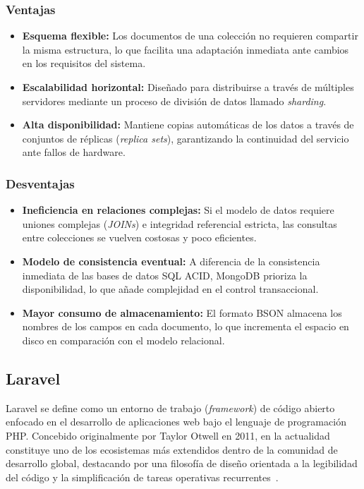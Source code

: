 \subsubsection{Ventajas}
\begin{itemize}
    \item \textbf{Esquema flexible:} Los documentos de una colección no requieren compartir la misma estructura, lo que facilita una adaptación inmediata ante cambios en los requisitos del sistema.
    \item \textbf{Escalabilidad horizontal:} Diseñado para distribuirse a través de múltiples servidores mediante un proceso de división de datos llamado \textit{sharding}.
    \item \textbf{Alta disponibilidad:} Mantiene copias automáticas de los datos a través de conjuntos de réplicas (\textit{replica sets}), garantizando la continuidad del servicio ante fallos de hardware.
\end{itemize}

\subsubsection{Desventajas}
\begin{itemize}
    \item \textbf{Ineficiencia en relaciones complejas:} Si el modelo de datos requiere uniones complejas (\textit{JOINs}) e integridad referencial estricta, las consultas entre colecciones se vuelven costosas y poco eficientes.
    \item \textbf{Modelo de consistencia eventual:} A diferencia de la consistencia inmediata de las bases de datos SQL ACID, MongoDB prioriza la disponibilidad, lo que añade complejidad en el control transaccional.
    \item \textbf{Mayor consumo de almacenamiento:} El formato BSON almacena los nombres de los campos en cada documento, lo que incrementa el espacio en disco en comparación con el modelo relacional.
\end{itemize}

\subsection{Laravel}



Laravel se define como un entorno de trabajo (\textit{framework}) de código abierto enfocado en el desarrollo de aplicaciones web bajo el lenguaje de programación PHP. Concebido originalmente por Taylor Otwell en 2011, en la actualidad constituye uno de los ecosistemas más extendidos dentro de la comunidad de desarrollo global, destacando por una filosofía de diseño orientada a la legibilidad del código y la simplificación de tareas operativas recurrentes~\cite{LaravelDocs}.



